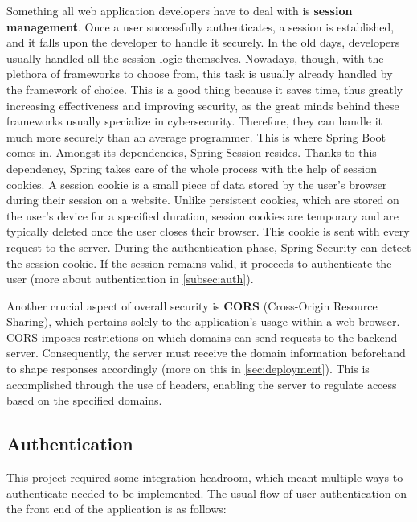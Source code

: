 \documentclass[FM,BP,EN,fonts]{tulthesis}
\begin{document}
Something all web application developers have to deal with is \textbf{session management}. Once a user successfully authenticates, a session is established, and it falls upon the developer to handle it securely. In the old days, developers usually handled all the session logic themselves. Nowadays, though, with the plethora of frameworks to choose from, this task is usually already handled by the framework of choice. This is a good thing because it saves time, thus greatly increasing effectiveness and improving security, as the great minds behind these frameworks usually specialize in cybersecurity. Therefore, they can handle it much more securely than an average programmer. This is where Spring Boot comes in. Amongst its dependencies, Spring Session resides. Thanks to this dependency, Spring takes care of the whole process with the help of session cookies. A session cookie is a small piece of data stored by the user's browser during their session on a website. Unlike persistent cookies, which are stored on the user's device for a specified duration, session cookies are temporary and are typically deleted once the user closes their browser. This cookie is sent with every request to the server. During the authentication phase, Spring Security can detect the session cookie. If the session remains valid, it proceeds to authenticate the user (more about authentication in \autoref{subsec:auth}).

Another crucial aspect of overall security is \textbf{CORS} (Cross-Origin Resource Sharing), which pertains solely to the application's usage within a web browser. CORS imposes restrictions on which domains can send requests to the backend server. Consequently, the server must receive the domain information beforehand to shape responses accordingly (more on this in \autoref{sec:deployment}). This is accomplished through the use of headers, enabling the server to regulate access based on the specified domains.

\subsection{Authentication}
\label{subsec:auth}
This project required some integration headroom, which meant multiple ways to authenticate needed to be implemented. The usual flow of user authentication on the front end of the application is as follows:
\end{document}
